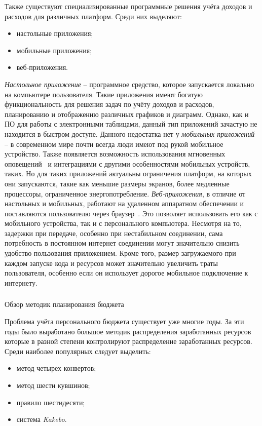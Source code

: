 Также существуют специализированные программные решения учёта доходов и расходов для различных платформ.
Среди них выделяют:
\begin{itemize}
    \item настольные приложения;
    \item мобильные приложения;
    \item веб-приложения.
\end{itemize}

\emph{Настольное приложение} -- программное средство, которое запускается локально на компьютере пользователя.
Такие приложения имеют богатую функциональность для решения задач по учёту доходов и расходов, планированию и отображению различных графиков и диаграмм.
Однако, как и ПО для работы с электронными таблицами, данный тип приложений зачастую не находится в быстром доступе.
Данного недостатка нет у \emph{мобильных приложений} -- в современном мире почти всегда люди имеют под рукой мобильное устройство.
Также появляется возможность использования мгновенных оповещений~\cite{desktop_mobile_differences} и интеграциями с другими особенностями мобильных устройств, таких.
Но для таких приложений актуальны ограничения платформ, на которых они запускаются, такие как меньшие размеры экранов, более медленные процессоры, ограниченное энергопотребление.
\emph{Веб-приложения}, в отличие от настольных и мобильных, работают на удаленном аппаратном обеспечении и поставляются пользователю через браузер~\cite{web_based_vs_desktop}.
Это позволяет использовать его как с мобильного устройства, так и с персонального компьютера.
Несмотря на то, задержки при передаче, особенно при нестабильном соединении, сама потребность в постоянном интернет соединении могут значительно снизить удобство пользования приложением.
Кроме того, размер загружаемого при каждом запуске кода и ресурсов может значительно увеличить траты пользователя, особенно если он использует дорогое мобильное подключение к интернету.

\subsubsection{} Обзор методик планирования бюджета
\label{sec:analysis:literature:planning}

Проблема учёта персонального бюджета существует уже многие годы.
За эти годы было выработано большое методик распределения заработанных ресурсов которые в разной степени контролируют распределение заработанных ресурсов.
Среди наиболее популярных следует выделить:
\begin{itemize}
    \item метод четырех конвертов;
    \item метод шести кувшинов;
    \item правило шестидесяти;
    \item система \emph{Kakebo}.
\end{itemize}

